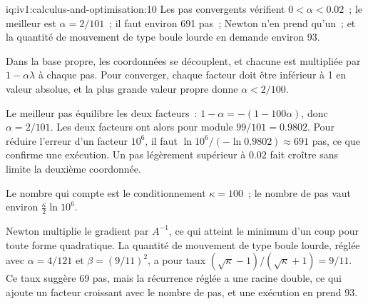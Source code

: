 \begin{solution}{iq:iv1:calculus-and-optimisation:10}
Les pas convergents vérifient $0 < \alpha < 0.02$~; le meilleur est $\alpha = 2/101$~; il faut environ 691 pas~; Newton n'en prend qu'un~; et la quantité de mouvement de type boule lourde en demande environ 93.

Dans la base propre, les coordonnées se découplent, et chacune est multipliée par $1 - \alpha\lambda$ à chaque pas. Pour converger, chaque facteur doit être inférieur à 1 en valeur absolue, et la plus grande valeur propre donne $\alpha < 2/100$.

Le meilleur pas équilibre les deux facteurs~: $1 - \alpha = -(1 - 100\alpha)$, donc $\alpha = 2/101$. Les deux facteurs ont alors pour module $99/101 = 0.9802$. Pour réduire l'erreur d'un facteur $10^6$, il faut $\ln 10^6 / (-\ln 0.9802) \approx 691$ pas, ce que confirme une exécution. Un pas légèrement supérieur à $0.02$ fait croître sans limite la deuxième coordonnée.

Le nombre qui compte est le conditionnement $\kappa = 100$~; le nombre de pas vaut environ $\frac{\kappa}{2}\ln 10^6$.

Newton multiplie le gradient par $A^{-1}$, ce qui atteint le minimum d'un coup pour toute forme quadratique. La quantité de mouvement de type boule lourde, réglée avec $\alpha = 4/121$ et $\beta = (9/11)^2$, a pour taux $(\sqrt{\kappa} - 1)/(\sqrt{\kappa} + 1) = 9/11$. Ce taux suggère 69 pas, mais la récurrence réglée a une racine double, ce qui ajoute un facteur croissant avec le nombre de pas, et une exécution en prend 93.



\end{solution}

